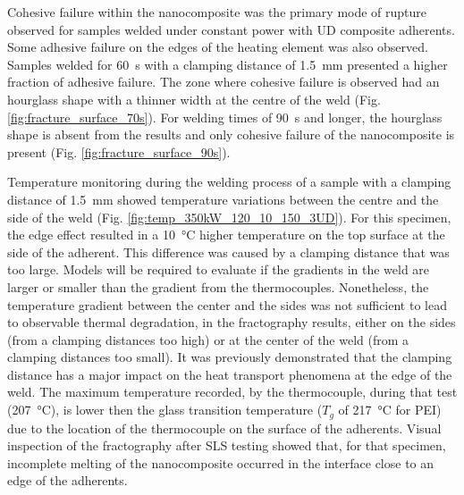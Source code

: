 \documentclass[11pt,review,times]{elsarticle}
\begin{document}
Cohesive failure within the nanocomposite was the primary mode of rupture observed for samples welded under constant power with UD composite adherents.
Some adhesive failure on the edges of the heating element was also observed. 
Samples welded for \SI{60}{\s} with a clamping distance of \SI{1.5}{\mm} presented a higher fraction of adhesive failure. 
The zone where cohesive failure is observed had an hourglass shape with a thinner width at the centre of the weld (Fig. \ref{fig:fracture_surface_70s}). 
For welding times of \SI{90}{\s} and longer, the hourglass shape is absent from the results and only cohesive failure of the nanocomposite is present (Fig. \ref{fig:fracture_surface_90s}). 

Temperature monitoring during the welding process of a sample with a clamping distance of \SI{1.5}{\mm} showed temperature variations between the centre and the side of the weld (Fig. \ref{fig:temp_350kW_120_10_150_3UD}).
For this specimen, the edge effect resulted in a \SI{10}{\celsius} higher temperature on the top surface at the side of the adherent. 
This difference was caused by a clamping distance that was too large. 
Models will be required to evaluate if the gradients in the weld are larger or smaller than the gradient from the thermocouples. 
Nonetheless, the temperature gradient between the center and the sides was not sufficient to lead to observable thermal degradation, in the fractography results, either on the sides (from a clamping distances too high) or at the center of the weld (from a clamping distances too small). 
It was previously demonstrated that the clamping distance has a major impact on the heat transport phenomena at the edge of the weld.
The maximum temperature recorded, by the thermocouple, during that test (\SI{207}{\celsius}), is lower then the glass transition temperature ($T_g$ of \SI{217}{\celsius} for PEI) due to the location of the thermocouple on the surface of the adherents. 
Visual inspection of the fractography after SLS testing showed that, for that specimen, incomplete melting of the nanocomposite occurred in the interface close to an edge of the adherents. 
\end{document}
